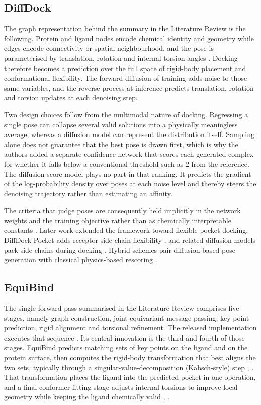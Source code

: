 \hypertarget{diffdock-1}{%
\subsection{DiffDock}\label{diffdock-1}}

The graph representation behind the summary in the Literature Review is the following. Protein and ligand nodes encode chemical identity and geometry while edges encode connectivity or spatial neighbourhood, and the pose is parameterised by translation, rotation and internal torsion angles \cite{ref024}. Docking therefore becomes a prediction over the full space of rigid-body placement and conformational flexibility. The forward diffusion of training adds noise to those same variables, and the reverse process at inference predicts translation, rotation and torsion updates at each denoising step.

Two design choices follow from the multimodal nature of docking. Regressing a single pose can collapse several valid solutions into a physically meaningless average, whereas a diffusion model can represent the distribution itself. Sampling alone does not guarantee that the best pose is drawn first, which is why the authors added a separate confidence network that scores each generated complex for whether it falls below a conventional threshold such as 2\angstrom{} from the reference. The diffusion score model plays no part in that ranking. It predicts the gradient of the log-probability density over poses at each noise level and thereby steers the denoising trajectory rather than estimating an affinity.

The criteria that judge poses are consequently held implicitly in the network weights and the training objective rather than as chemically interpretable constants \cite{ref024}. Later work extended the framework toward flexible-pocket docking. DiffDock-Pocket adds receptor side-chain flexibility \cite{ref030}, and related diffusion models pack side chains during docking \cite{ref031}. Hybrid schemes pair diffusion-based pose generation with classical physics-based rescoring \cite{ref064}.

\hypertarget{equibind-1}{%
\subsection{EquiBind}\label{equibind-1}}

The single forward pass summarised in the Literature Review comprises five stages, namely graph construction, joint equivariant message passing, key-point prediction, rigid alignment and torsional refinement. The released implementation executes that sequence \cite{ref009}. Its central innovation is the third and fourth of those stages. EquiBind predicts matching sets of key points on the ligand and on the protein surface, then computes the rigid-body transformation that best aligns the two sets, typically through a singular-value-decomposition (Kabsch-style) step \cite{ref010}, \cite{ref062}. That transformation places the ligand into the predicted pocket in one operation, and a final conformer-fitting stage adjusts internal torsions to improve local geometry while keeping the ligand chemically valid \cite{ref009}, \cite{ref010}.

